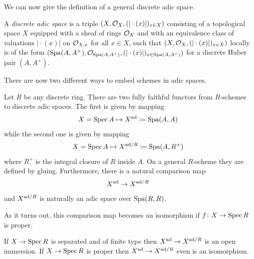 We can now give the definition of a general discrete adic space.
\begin{definition}
	A \emph{discrete adic space} is a triple $(X, {{\mathcal{O}}_{X}}, (\vert\cdot(x)\vert)_{x\in X})$ consisting of a topological space $X$ equipped with a sheaf of rings ${{\mathcal{O}}_{X}}$ and with an equivalence class of valuations $\vert\cdot(x)\vert$ on ${\mathcal{O}}_{X, x}$ for all $x\in X$, such that $(X, {{\mathcal{O}}_{X}}, (\vert\cdot(x)\vert)_{x\in X})$ locally is of the form $(\operatorname{Spa}(A, A^+), {{\mathcal{O}}_{\operatorname{Spa}(A, A^+ )}}, (\vert\cdot(x)\vert)_{x\in \operatorname{Spa}(A, A^+)})$ for a discrete Huber pair $(A, A^+)$.
\end{definition}

There are now two different ways to embed schemes in adic spaces.
\begin{remark}
	Let $R$ be any discrete ring. There are two fully faithful functors from $R$-schemes to discrete adic spaces. The first is given by mapping
		$$X=\operatorname{Spec} A \mapsto X^{\mathrm{ad}} \coloneqq \operatorname{Spa}(A, A)$$
	while the second one is given by mapping
		$$X=\operatorname{Spec} A\mapsto X^{{\mathrm{ad}}/R} \coloneqq \operatorname{Spa}(A, R^+)$$
	where $R^+$ is the integral closure of $R$ inside $A$. On a general $R$-scheme they are defined by gluing. Furthermore, there is a natural comparison map
		$$X^{\mathrm{ad}} \to X^{{\mathrm{ad}}/R}$$
	and $X^{{\mathrm{ad}}/R}$ is naturally an adic space over $\operatorname{Spa}(R, R)$.
\end{remark}

As it turns out, this comparison map becomes an isomorphism if $f\colon X\to \operatorname{Spec} R$ is proper.
\begin{proposition}
	\label{proposition: comparison map for proper maps}
	
	If $X\to \operatorname{Spec} R$ is separated and of finite type then $X^{\mathrm{ad}} \to X^{{\mathrm{ad}}/R}$ is an open immersion. If $X \to \operatorname{Spec} R$ is proper then $X^{\mathrm{ad}}\to X^{{\mathrm{ad}}/R}$ even is an isomorphism.
\end{proposition}


